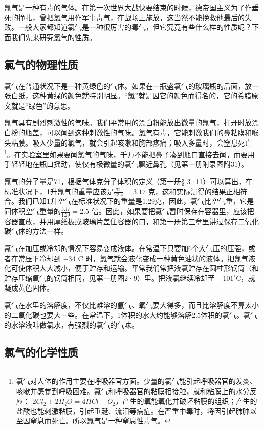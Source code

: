 氯气是一种有毒的气体。在第一次世界大战快要结束的时候，德帝国主义为了作垂死的挣扎，曾把氯气用作军事毒气，在战场上施放，这当然不能挽救他最后的失败。一般大家都知道氯气是一种很厉害的毒气，但它究竟有些什么样的性质呢？下面我们先来研究氯气的性质。

\subsection{氯气的物理性质}

氯气在普通状况下是一种黄绿色的气体。如果在一瓶盛氯气的玻璃瓶的后面，放一张白纸，这种黄绿的颜色就特别明显。``氯''就是因它的颜色而得名的，它的希腊原文就是``绿色''的意思。

氯气具有剧烈刺激性的气味。我们平常用的漂白粉能放出微量的氯气，打开时放漂白粉的瓶盖，可以闻到这种刺激性的气味。氯气有毒，它能刺激我们的鼻粘膜和喉头粘膜。吸入少量的氯气，就会引起咳嗽和胸部疼痛；吸入多量时，会窒息死亡\footnote{氯气对人体的作用主要在呼吸器官方面。少量的氯气能引起呼吸器官的发炎、咳嗽并感觉到呼吸困难。氯气和呼吸器官的粘膜相接触，就和粘膜上的水分反应：
  \(2Cl_{2}+2H_{2}O=4HCl+O_{2}\)，产生的氧能氧化并破坏粘膜的组织；产生的盐酸也能刺激粘膜，引起垂涎、流泪等病症。在严重中毒时，将因引起肺肿以至因窒息而死亡。所以氯气是一种窒息性毒气。}。在实验室里如果要闻氯气的气味，千万不能把鼻子凑到瓶口直接去闻，而要用手轻轻地在瓶口摇动，使仅有极微量的氯气飘近鼻孔（见第一册附录图附31）。

氯气的分子量是71，根据气体克分子体积的定义（第一册§
3·11）可以算出，在标准状况下，1升氯气的重量应该是\(\frac{71}{22.4}=3.17\)
克，这和实际测得的结果正相符合。我们已知1升空气在标准状况下的重量是1.29克，因此，氯气比空气重，它是同体积空气重量的\(\frac{3.17}{1.29}=2.5\)
倍。因此，如果要把氯气暂时保存在容器里，应该把容器直放，并用厚纸板或玻璃片盖住容器的口，和第一册第三章里讲过保存二氧化碳气体的方法一样。

氯气在加压或冷却的情况下容易变成液体。在常温下只要加6个大气压的压强，或者在常压下冷却到
\(-34^{\circ}\mathrm{C}\)
时，氯气就会液化变成一种黄色油状的液体。把氯气液化可使体积大大减小，便于贮存和运输。平常我们常把液氯贮存在圆柱形钢筒（和贮存压缩氧气的钢筒相同，见第一册图2·9）里。把液氯继续冷却至
\(-101^{\circ}\mathrm{C}\)，就凝成黄色固体。

氯气在水里的溶解度，不仅比难溶的氩气、氧气要大得多，而且比溶解度不算太小的二氧化碳也要大一些。在常温下，1体积的水大约能够溶解2.5体积的氯气。氯气的水溶液叫做氯水，有强烈的氯气的气味。

\subsection{氯气的化学性质}

